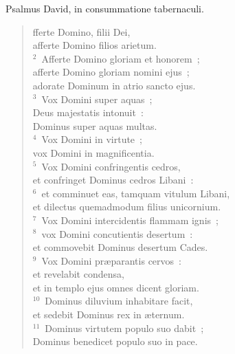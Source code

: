 \bchapter[Psalm]
Psalmus David, in consummatione tabernaculi. \begin{verse}fferte Domino, filii Dei,\\ afferte Domino filios arietum.\\
${}^{2}$~Afferte Domino gloriam et honorem~;\\ afferte Domino gloriam nomini ejus~;\\ adorate Dominum in atrio sancto ejus.\\
${}^{3}$~Vox Domini super aquas~;\\ Deus majestatis intonuit~:\\ Dominus super aquas multas.\\
${}^{4}$~Vox Domini in virtute~;\\ vox Domini in magnificentia.\\
${}^{5}$~Vox Domini confringentis cedros,\\ et confringet Dominus cedros Libani~:\\
${}^{6}$~et comminuet eas, tamquam vitulum Libani,\\ et dilectus quemadmodum filius unicornium.\\
${}^{7}$~Vox Domini intercidentis flammam ignis~;\\
${}^{8}$~vox Domini concutientis desertum~:\\ et commovebit Dominus desertum Cades.\\
${}^{9}$~Vox Domini pr\ae parantis cervos~:\\ et revelabit condensa,\\ et in templo ejus omnes dicent gloriam.\\
${}^{10}$~Dominus diluvium inhabitare facit,\\ et sedebit Dominus rex in \ae ternum.\\
${}^{11}$~Dominus virtutem populo suo dabit~;\\ Dominus benedicet populo suo in pace.\end{verse}



